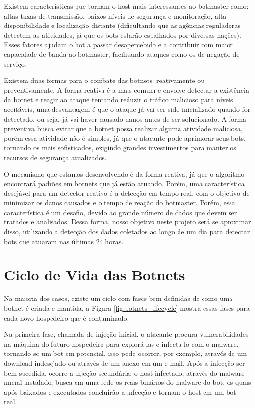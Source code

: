 Existem características que tornam o host mais interessantes ao botmaster como: altas taxas de transmissão, baixos níveis de segurança e monitoração, alta disponibilidade e localização distante (dificultando que as agências reguladoras detectem as atividades, já que os bots estarão espalhados por diversas nações). Esses fatores ajudam o bot a passar desapercebido e a contribuir com maior capacidade de banda ao botmaster, facilitando ataques como os de negação de serviço.

Existem duas formas para o combate das botnets: reativamente ou preventivamente. A forma reativa é a mais comum e envolve detectar a existência da botnet e reagir ao ataque tentando reduzir o tráfico malicioso para níveis aceitáveis, uma desvantagem é que o ataque já vai ter sido inicializado quando for detectado, ou seja, já vai haver causado danos antes de ser solucionado. A forma preventiva busca evitar que a botnet possa realizar alguma atividade maliciosa, porém essa atividade não é simples, já que o atacante pode aprimorar seus bots, tornando os mais sofisticados, exigindo grandes investimentos para manter os recursos de segurança atualizados.

O mecanismo que estamos desenvolvendo é da forma reativa, já que o algoritmo encontrará padrões em botnets que já estão atuando. Porém, uma característica desejável para um detector reativo é a detecção em tempo real, com o objetivo de minimizar os danos causados e o tempo de reação do botmaster. Porém, essa característica é um desafio, devido ao grande número de dados que devem ser tratados e analisados. Dessa forma, nosso objetivo neste projeto será se aproximar disso, utilizando a detecção dos dados coletados ao longo de um dia para detectar bots que atuaram nas últimas 24 horas.

\section{Ciclo de Vida das Botnets}
Na maioria dos casos, existe um ciclo com fases bem definidas de como uma botnet é criada e mantida, a Figura \ref{fig:botnets_lifecycle} mostra essas fases para cada novo hospedeiro que é contaminado. 

Na primeira fase, chamada de injeção inicial, o atacante procura vulnerabilidades na máquina do futuro hospedeiro para explorá-las e infecta-lo com o malware, tornando-se um bot em potencial, isso pode ocorrer, por exemplo, através de um download indesejado ou através de um anexo em um e-mail. Após a infecção ser bem sucedida, ocorre a injeção secundária: o host infectado, através do malware inicial instalado, busca em uma rede os reais binários do malware do bot, os quais após baixados e executados concluirão a infecção e tornam o host em um bot real.\cite{feily2009survey}.


